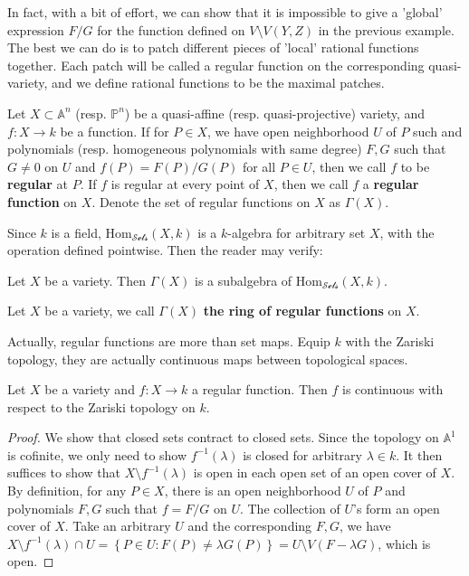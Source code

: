 \documentclass{note-eng}
\begin{document}
In fact, with a bit of effort, we can show that it is impossible to give a 'global' expression $F / G$ for the function defined on $V \setminus V(Y, Z)$ in the previous example. The best we can do is to patch different pieces of 'local' rational functions together. Each patch will be called a regular function on the corresponding quasi-variety, and we define rational functions to be the maximal patches.

\begin{definition}
    Let $X \subset \mathbb{A}^n$ (resp. $\mathbb{P}^n$) be a quasi-affine (resp. quasi-projective) variety, and $f: X \rightarrow k$ be a function. If for $P \in X$, we have open neighborhood $U$ of $P$ such and polynomials (resp. homogeneous polynomials with same degree) $F, G$ such that $G \ne 0$ on $U$ and $f(P) = F(P) / G(P)$ for all $P \in U$, then we call $f$ to be \textbf{regular} at $P$. If $f$ is regular at every point of $X$, then we call $f$ a \textbf{regular function} on $X$. Denote the set of regular functions on $X$ as $\Gamma(X)$.
\end{definition}

Since $k$ is a field, $\mathrm{Hom}_{\mathscr{Sets}}(X, k)$ is a $k$-algebra for arbitrary set $X$, with the operation defined pointwise. Then the reader may verify:

\begin{proposition}
    Let $X$ be a variety. Then $\Gamma(X)$ is a subalgebra of $\mathrm{Hom}_{\mathscr{Sets}}(X, k)$.
\end{proposition}

\begin{definition}
    Let $X$ be a variety, we call $\Gamma(X)$ \textbf{the ring of regular functions} on $X$.
\end{definition}

Actually, regular functions are more than set maps. Equip $k$ with the Zariski topology, they are actually continuous maps between topological spaces.

\begin{proposition}\label{prop:regular-cont}
    Let $X$ be a variety and $f: X \rightarrow k$ a regular function. Then $f$ is continuous with respect to the Zariski topology on $k$.
\end{proposition}

\begin{proof}
    We show that closed sets contract to closed sets. Since the topology on $\mathbb{A}^1$ is cofinite, we only need to show $f ^{-1} (\lambda)$ is closed for arbitrary $\lambda \in k$. It then suffices to show that $X \setminus f ^{-1}(\lambda)$ is open in each open set of an open cover of $X$. By definition, for any $P \in X$, there is an open neighborhood $U$ of $P$ and polynomials $F, G$ such that $f = F / G$ on $U$. The collection of $U$'s form an open cover of $X$. Take an arbitrary $U$ and the corresponding $F, G$, we have $X \setminus f ^{-1}(\lambda) \cap U = \left\lbrace P \in U: F(P) \ne \lambda G(P) \right\rbrace = U \setminus V(F - \lambda G)$, which is open.
\end{proof}
\end{document}
